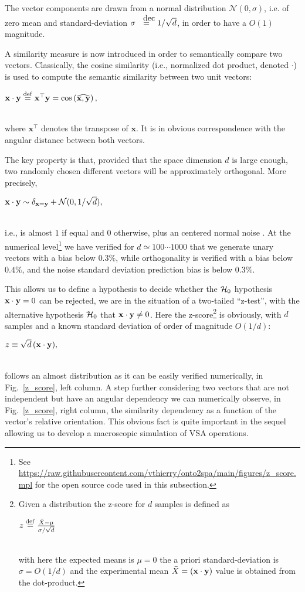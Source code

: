 \documentclass[sn-mathphys]{sn-jnl}
\newcommand{\defq}{\stackrel {\rm def}{=}}
\newcommand{\eqline}[1]{~\vspace{0.1cm}\\\centerline{$#1$}\vspace{0.1cm}\\}
\begin{document}
The vector components are drawn from a normal distribution ${\mathcal N}(0, \sigma)$, i.e. of zero mean and standard-deviation $\sigma \deq 1/\sqrt{d}$, in order to have a $O(1)$ magnitude.

A similarity measure is now introduced in order to semantically compare two vectors. Classically, the cosine similarity (i.e., normalized dot product, denoted $\cdot$) is used to compute the semantic similarity between two unit vectors:
\eqline{\mathbf{x} \cdot \mathbf{y} \defq \mathbf{x}^\top \mathbf{y} = \cos\left(\widehat{\mathbf{x}, \mathbf{y}}\right),}
where $\mathbf{x}^\top$ denotes the transpose of $\mathbf{x}$.  It is in obvious correspondence with the angular distance between both vectors.

The key property is that, provided that the space dimension $d$ is large enough, two randomly chosen different vectors will be approximately orthogonal. More precisely,
\eqline{{\bf x} \cdot {\bf y} \sim \delta_{{\bf x} = {\bf y}} + {\mathcal N}(0, 1/\sqrt{d}),}
i.e., is almost $1$ if equal and $0$ otherwise, plus an centered normal noise \cite{schlegel_comparison_2020}. At the numerical level\footnote{See \url{https://raw.githubusercontent.com/vthierry/onto2spa/main/figures/z_score.mpl} for the open source code used in this subsection.} we have verified for $d\simeq 100 \cdots 1000$ that we generate unary vectors with a bias below $0.3\%$, while orthogonality is verified with a bias below $0.4\%$, and the noise standard deviation prediction bias is below $0.3\%$. 

This allows us to define a hypothesis to decide whether the ${\cal H}_0$ hypothesis ${\bf x} \cdot {\bf y} = 0$ can be rejected, we are in the situation of a two-tailed ``z-test'', with the alternative hypothesis ${\cal H}_0$ that ${\bf x} \cdot {\bf y} \neq 0$. Here the z-score\footnote{Given a distribution the z-score for $d$ samples is defined as
\eqline{z \defq \frac{\bar{X} - \mu}{\sigma / \sqrt{d}}}
with here the expected means is $\mu = 0$ the a priori standard-deviation is $\sigma = O(1/d)$ and the experimental mean $\bar{X} = ({\bf x} \cdot {\bf y})$ value is obtained from the dot-product.} is obviously, with $d$ samples and a known standard deviation of order of magnitude $O(1/d)$:
\eqline{z \equiv \sqrt{d} \, ({\bf x} \cdot {\bf y}),}
follows an almost distribution as it can be easily verified numerically, in Fig.~\ref{z_score}, left column. A step further considering two vectors that are not independent but have an angular dependency we can numerically observe, in Fig.~\ref{z_score}, right column, the similarity dependency as a function of the vector's relative orientation. This obvious fact is quite important in the sequel allowing us to develop a macroscopic simulation of VSA operations.
\end{document}
